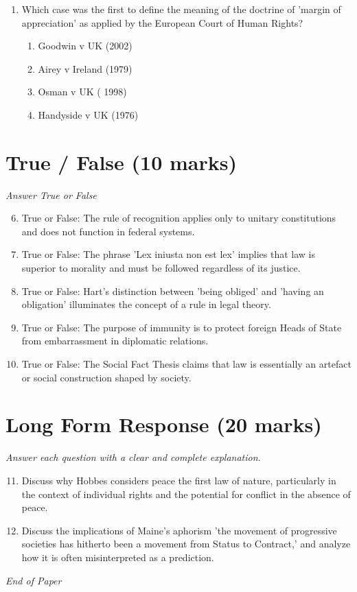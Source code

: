 \documentclass[12pt]{article}
\begin{document}
\begin{enumerate}[label=\arabic*.]
\begin{enumerate}[label=(\alph*)]
    \item Command, sovereign and legal remedy
    \item Command, sovereign and sanction
    \item Command, sovereign and obedience by subject
\end{enumerate}
\item Which case was the first to define the meaning of the doctrine of 'margin of appreciation' as applied by the European Court of Human Rights?
\begin{enumerate}[label=(\alph*)]
    \item Goodwin v UK (2002)
    \item Airey v Ireland (1979)
    \item Osman v UK ( 1998)
    \item Handyside v UK (1976)
\end{enumerate}
\end{enumerate}

\section*{True / False (10 marks)}
\textit{Answer True or False}
\begin{enumerate}[label=\arabic*.]
\setcounter{enumi}{5}
\item True or False: The rule of recognition applies only to unitary constitutions and does not function in federal systems.
\item True or False: The phrase 'Lex iniusta non est lex' implies that law is superior to morality and must be followed regardless of its justice.
\item True or False: Hart's distinction between 'being obliged' and 'having an obligation' illuminates the concept of a rule in legal theory.
\item True or False: The purpose of immunity is to protect foreign Heads of State from embarrassment in diplomatic relations.
\item True or False: The Social Fact Thesis claims that law is essentially an artefact or social construction shaped by society.
\end{enumerate}

\section*{Long Form Response (20 marks)}
\textit{Answer each question with a clear and complete explanation.}
\begin{enumerate}[label=\arabic*.]
\setcounter{enumi}{10}
\item Discuss why Hobbes considers peace the first law of nature, particularly in the context of individual rights and the potential for conflict in the absence of peace.
\item Discuss the implications of Maine's aphorism 'the movement of progressive societies has hitherto been a movement from Status to Contract,' and analyze how it is often misinterpreted as a prediction.
\end{enumerate}

\vfill
\noindent\textit{End of Paper}
\end{document}
